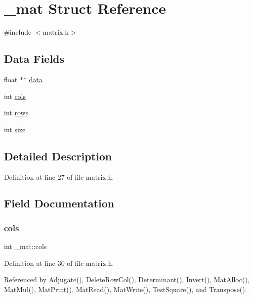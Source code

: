 \hypertarget{struct__mat}{}\section{\+\_\+mat Struct Reference}
\label{struct__mat}


{\ttfamily \#include $<$matrix.\+h$>$}

\subsection*{Data Fields}
\begin{DoxyCompactItemize}
\item 
float $\ast$$\ast$ \hyperlink{struct__mat_a00dcd82a8de11b7f16f7edfde55bcfae}{data}
\item 
int \hyperlink{struct__mat_a5ee73c0c8484d47a000464681b298762}{cols}
\item 
int \hyperlink{struct__mat_a5e6bcb8b0c0239ca9b782c48b0b3c98a}{rows}
\item 
int \hyperlink{struct__mat_ab54203ad7b60fc23832cb3b2a863857f}{size}
\end{DoxyCompactItemize}


\subsection{Detailed Description}


Definition at line 27 of file matrix.\+h.



\subsection{Field Documentation}
\mbox{\label{struct__mat_a5ee73c0c8484d47a000464681b298762}} 
\subsubsection{\texorpdfstring{cols}{cols}}
{\footnotesize\ttfamily int \+\_\+mat\+::cols}



Definition at line 30 of file matrix.\+h.



Referenced by Adjugate(), Delete\+Row\+Col(), Determinant(), Invert(), Mat\+Alloc(), Mat\+Mul(), Mat\+Print(), Mat\+Read(), Mat\+Write(), Test\+Square(), and Transpose().

